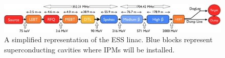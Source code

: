 \begin{figure}[!ht]
	\begin{center}
		\includegraphics[width=\textwidth]{02_BeamDiag/figures/fig000_ESS_acc}
	\end{center}
	\caption[A simplified representation of the ESS linac]{A simplified representation of the ESS linac. Blue blocks represent superconducting cavities where IPMs will be installed.}
	\label{chap:}
\end{figure}
